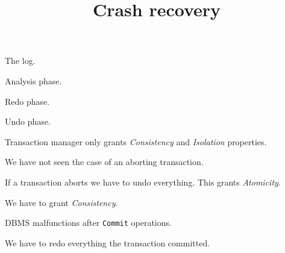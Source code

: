 \documentclass{beamer}
\title{ Crash recovery }
\author{ }
\institute{Hogeschool Rotterdam \\ 
Rotterdam, Netherlands}
\date{}
\begin{document}
\maketitle

\begin{slide}{
\item The log.
\item Analysis phase.
\item Redo phase.
\item Undo phase.
}\end{slide}

\begin{slide}{
	\item Transaction manager only grants \textit{Consistency} and \textit{Isolation} properties.
	\item We have not seen the case of an aborting transaction.
	\item If a transaction aborts we have to undo everything. This grants \textit{Atomicity}.
}\end{slide}

\begin{slide}{
	\item We have to grant \textit{Consistency}.
	\item DBMS malfunctions after \texttt{Commit} operations.
	\item We have to redo everything the transaction committed.
}\end{slide}
\end{document}
